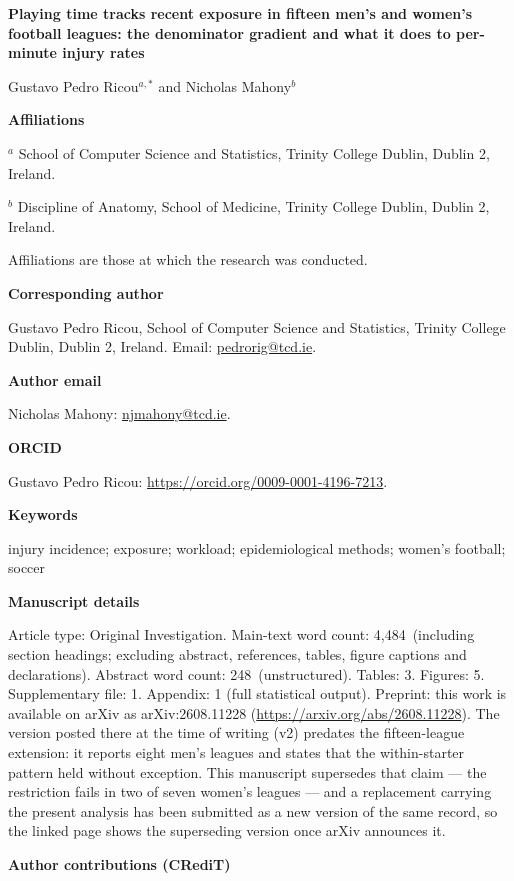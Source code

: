 \documentclass[11pt]{article}
\newcommand{\papertitle}{Playing time tracks recent exposure in fifteen men's and women's football leagues: the denominator gradient and what it does to per-minute injury rates}
\newcommand{\mainwordcount}{4,484}
\newcommand{\abstractwordcount}{248}
\newcommand{\keywordlist}{injury incidence; exposure; workload; epidemiological methods; women's football; soccer}
\begin{document}
\begin{center}
{\Large\bfseries \papertitle\par}
\vspace{1.5em}
{\large Gustavo Pedro Ricou$^{a,*}$ and Nicholas Mahony$^{b}$\par}
\end{center}

\textbf{Affiliations}

$^{a}$ School of Computer Science and Statistics, Trinity College Dublin,
Dublin 2, Ireland.

$^{b}$ Discipline of Anatomy, School of Medicine, Trinity College Dublin,
Dublin 2, Ireland.

Affiliations are those at which the research was conducted.

\textbf{Corresponding author}

Gustavo Pedro Ricou, School of Computer Science and Statistics, Trinity
College Dublin, Dublin 2, Ireland. Email: \href{mailto:pedrorig@tcd.ie}{pedrorig@tcd.ie}.

\textbf{Author email}

Nicholas Mahony: \href{mailto:njmahony@tcd.ie}{njmahony@tcd.ie}.

\textbf{ORCID}

Gustavo Pedro Ricou: \url{https://orcid.org/0009-0001-4196-7213}.

\textbf{Keywords}

\keywordlist

\textbf{Manuscript details}

Article type: Original Investigation. Main-text word count: \mainwordcount\
(including section headings; excluding abstract, references, tables, figure
captions and declarations). Abstract word count: \abstractwordcount\ (unstructured).
Tables: 3. Figures: 5. Supplementary file: 1. Appendix: 1 (full statistical output).
Preprint: this work is available on arXiv as arXiv:2608.11228
(\url{https://arxiv.org/abs/2608.11228}). The version posted there at the time
of writing (v2) predates the fifteen-league extension: it reports eight men's
leagues and states that the within-starter pattern held without exception. This
manuscript supersedes that claim --- the restriction fails in two of seven
women's leagues --- and a replacement carrying the present analysis has been
submitted as a new version of the same record, so the linked page shows the
superseding version once arXiv announces it.

\textbf{Author contributions (CRediT)}
\end{document}
